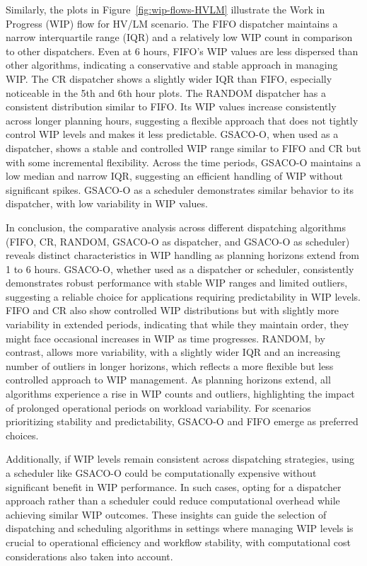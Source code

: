 Similarly, the plots in Figure~\ref{fig:wip-flows-HVLM} illustrate the Work in Progress (WIP) flow for HV/LM scenario. The FIFO dispatcher maintains a narrow interquartile range (IQR) and a relatively low WIP count in comparison to other dispatchers.
Even at 6 hours, FIFO’s WIP values are less dispersed than other algorithms, indicating a conservative and stable approach in managing WIP.
The CR dispatcher shows a slightly wider IQR than FIFO, especially noticeable in the 5th and 6th hour plots.
The RANDOM dispatcher has a consistent distribution similar to FIFO. Its WIP values increase consistently across longer planning hours, suggesting a flexible approach that does not tightly control WIP levels and makes it less predictable.
GSACO-O, when used as a dispatcher, shows a stable and controlled WIP range similar to FIFO and CR but with some incremental flexibility.
Across the time periods, GSACO-O maintains a low median and narrow IQR, suggesting an efficient handling of WIP without significant spikes. GSACO-O as a scheduler demonstrates similar behavior to its dispatcher, with low variability in WIP values.

In conclusion, the comparative analysis across different dispatching algorithms (FIFO, CR, RANDOM, GSACO-O as dispatcher, and GSACO-O as scheduler) reveals distinct characteristics in WIP handling as planning horizons extend from 1 to 6 hours.
GSACO-O, whether used as a dispatcher or scheduler, consistently demonstrates robust performance with stable WIP ranges and limited outliers, suggesting a reliable choice for applications requiring predictability in WIP levels. FIFO and CR also show controlled WIP distributions but with slightly more variability in extended periods, indicating that while they maintain order, they might face occasional increases in WIP as time progresses. RANDOM, by contrast, allows more variability, with a slightly wider IQR and an increasing number of outliers in longer horizons, which reflects a more flexible but less controlled approach to WIP management.
As planning horizons extend, all algorithms experience a rise in WIP counts and outliers, highlighting the impact of prolonged operational periods on workload variability. For scenarios prioritizing stability and predictability, GSACO-O and FIFO emerge as preferred choices.

Additionally, if WIP levels remain consistent across dispatching strategies, using a scheduler like GSACO-O could be computationally expensive without significant benefit in WIP performance. In such cases, opting for a dispatcher approach rather than a scheduler could reduce computational overhead while achieving similar WIP outcomes. These insights can guide the selection of dispatching and scheduling algorithms in settings where managing WIP levels is crucial to operational efficiency and workflow stability, with computational cost considerations also taken into account.
















